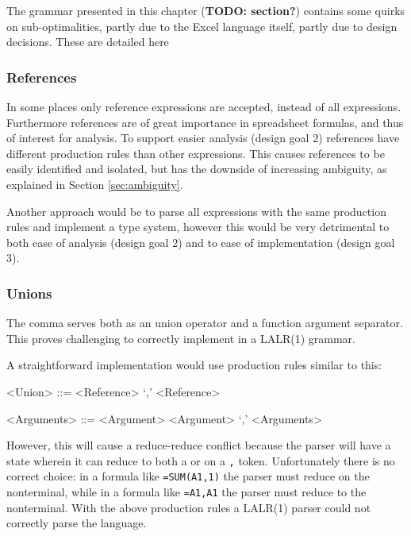 \documentclass[12pt,a4paper,onecolumn,oneside]{memoir}
\newcommand{\todo}[1]{\textbf{TODO: #1}}
\begin{document}
The grammar presented in this chapter (\todo{section?}) contains some quirks on sub-optimalities, partly due to the Excel language itself, partly due to design decisions.
These are detailed here

\subsubsection{\textbf{References}}
\label{tradeoff:references}

In some places only reference expressions are accepted, instead of all expressions.
Furthermore references are of great importance in spreadsheet formulas, and thus of interest for analysis.
To support easier analysis (design goal 2) references have different production rules than other expressions.
This causes references to be easily identified and isolated, but has the downside of increasing ambiguity, as explained in Section \ref{sec:ambiguity}. 

Another approach would be to parse all expressions with the same production rules and implement a type system, however this would be very detrimental to both ease of analysis (design goal 2) and to ease of implementation (design goal 3).

\subsubsection{\textbf{Unions}}
\label{subsec:desing:unions}

The comma serves both as an union operator and a function argument separator.
This proves challenging to correctly implement in a LALR(1) grammar.

A straightforward implementation would use production rules similar to this:
\begin{grammar}
<Union> ::= <Reference> `,' <Reference>

<Arguments> ::= <Argument>
	\alt <Argument> `,' <Arguments>
\end{grammar}

However, this will cause a reduce-reduce conflict because the parser will have a state wherein it can reduce to both a  or  on a \texttt{,} token.
Unfortunately there is no correct choice: in a formula like \texttt{=SUM(A1,1)} the parser must reduce on the  nonterminal, while in a formula like \texttt{=A1,A1} the parser must reduce to the  nonterminal.
With the above production rules a LALR(1) parser could not correctly parse the language.
\end{document}
